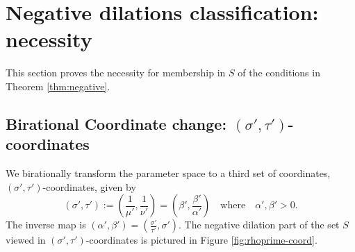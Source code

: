 \documentclass[11pt, letterpaper, reqno]{amsart}
\theoremstyle{definition}
\theoremstyle{remark}
\numberwithin{equation}{section}
\newcommand{\uu}{{\mu'}}
\newcommand{\vv}{{\nu'}}
\newcommand{\alphap}{{\alpha'}}
\newcommand{\betap}{{\beta'}}
\newcommand{\tbetap}{{\sigma'}}
\newcommand{\trhop}{{\tau'}}
\begin{document}
%
%
\section{Negative dilations classification: necessity}
\label{sec:negative-N}

This section proves   the necessity  for membership in $S$ of the conditions in  Theorem \ref{thm:negative}.


%
%
\subsection{Birational Coordinate change: $(\tbetap, \trhop)$-coordinates }\label{sec:birational-2} 

We birationally transform  the parameter space  
to a third set of coordinates,   $(\tbetap, \trhop)$-coordinates,
given by
\begin{equation}
(\tbetap, \trhop) := \left( \frac{1}{\uu}, \frac{1}{\vv} \right) 
= \left( \betap, \frac{\betap}{\alphap} \right) 
\quad\text{where}\quad \alphap, \betap > 0.
\end{equation}
The inverse map is    
$(\alphap, \betap) = (\frac{\tbetap}{\trhop}, \tbetap)$.
The negative dilation part of the set $S$ viewed in $(\tbetap, \trhop)$-coordinates
is pictured in Figure \ref{fig:rhoprime-coord}.
\end{document}
